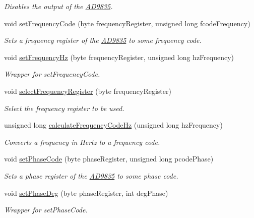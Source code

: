 \begin{DoxyCompactItemize}
\begin{DoxyCompactList}\small\item\em Disables the output of the \hyperlink{class_a_d9835}{AD9835}. \end{DoxyCompactList}\item 
void \hyperlink{class_a_d9835_a69fed84e2d0491ec55a52fd2931d89b5}{setFrequencyCode} (byte frequencyRegister, unsigned long fcodeFrequency)
\begin{DoxyCompactList}\small\item\em Sets a frequency register of the \hyperlink{class_a_d9835}{AD9835} to some frequency code. \end{DoxyCompactList}\item 
void \hyperlink{class_a_d9835_a9ab0533b29eb79e5106540802b406586}{setFrequencyHz} (byte frequencyRegister, unsigned long hzFrequency)
\begin{DoxyCompactList}\small\item\em Wrapper for setFrequencyCode. \end{DoxyCompactList}\item 
void \hyperlink{class_a_d9835_a423c2ddd038660e60a910e3c94e77c74}{selectFrequencyRegister} (byte frequencyRegister)
\begin{DoxyCompactList}\small\item\em Select the frequency register to be used. \end{DoxyCompactList}\item 
unsigned long \hyperlink{class_a_d9835_ad4a64d42b806f67e57eb37db913e3873}{calculateFrequencyCodeHz} (unsigned long hzFrequency)
\begin{DoxyCompactList}\small\item\em Converts a frequency in Hertz to a frequency code. \end{DoxyCompactList}\item 
void \hyperlink{class_a_d9835_a8ed5f2a122cc1820e3f90b24bceba02f}{setPhaseCode} (byte phaseRegister, unsigned long pcodePhase)
\begin{DoxyCompactList}\small\item\em Sets a phase register of the \hyperlink{class_a_d9835}{AD9835} to some phase code. \end{DoxyCompactList}\item 
void \hyperlink{class_a_d9835_aef6909397bd5e3b9ba25e412ba0c59b0}{setPhaseDeg} (byte phaseRegister, int degPhase)
\begin{DoxyCompactList}\small\item\em Wrapper for setPhaseCode. \end{DoxyCompactList}\item 

\end{DoxyCompactItemize}
